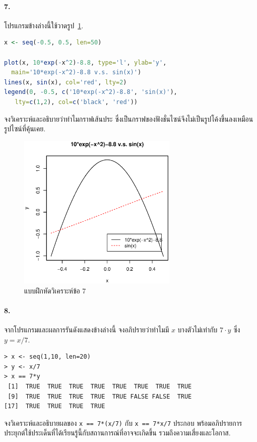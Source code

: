 \paragraph{7.} โปรแกรมข้างล่างนี้ใช้วาดรูป~\ref{fig: R plot ex5}. 
\begin{lstlisting}[language=R,caption={โค้ดสำหรับรูปแบบฝึกหัดข้อ 7}]
x <- seq(-0.5, 0.5, len=50)

plot(x, 10*exp(-x^2)-8.8, type='l', ylab='y',
  main='10*exp(-x^2)-8.8 v.s. sin(x)')
lines(x, sin(x), col='red', lty=2)
legend(0, -0.5, c('10*exp(-x^2)-8.8', 'sin(x)'),
   lty=c(1,2), col=c('black', 'red'))
\end{lstlisting}
จงวิเคราะห์และอธิบายว่าทำไมกราฟเส้นประ ซึ่งเป็นกราฟของฟังชั่นไซน์จึงไม่เป็นรูปโค้งขึ้นลงเหมือนรูปไซน์ที่คุ้นเคย.

%
\begin{figure}
\begin{center}
\includegraphics[width=3.0in]
{01Intro/RplotEx5.eps}
\end{center}
\caption{แบบฝึกหัดวิเคราะห์ข้อ 7}
\label{fig: R plot ex5}
\end{figure}
%

\paragraph{8.} จากโปรแกรมและผลการรันดังแสดงข้างล่างนี้
จงอภิปรายว่าทำไมมี $x$ บางตัวไม่เท่ากับ $7 \cdot y$ ซึ่ง $y = x/7$.
\begin{verbatim}
> x <- seq(1,10, len=20)
> y <- x/7
> x == 7*y
 [1]  TRUE  TRUE  TRUE  TRUE  TRUE  TRUE  TRUE  TRUE
 [9]  TRUE  TRUE  TRUE  TRUE  TRUE FALSE FALSE  TRUE
[17]  TRUE  TRUE  TRUE  TRUE
\end{verbatim}
จงวิเคราะห์และอธิบายผลของ \verb|x == 7*(x/7)| กับ \verb|x == 7*x/7| ประกอบ
พร้อมอภิปรายการประยุกต์ใช้ประเด็นที่ได้เรียนรู้นี้กับสถานการณ์ที่อาจจะเกิดขึ้น รวมถึงความเสี่ยงและโอกาส.

